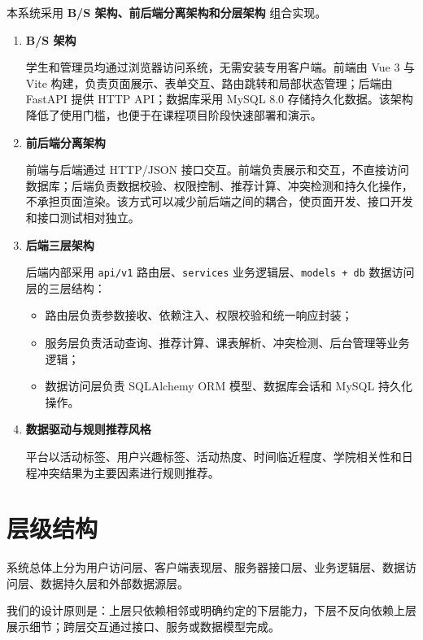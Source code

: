 \documentclass[UTF8,a4paper,12pt,fontset=none]{ctexrep}
\providecommand{\tightlist}{}
\begin{document}
本系统采用 \textbf{B/S 架构、前后端分离架构和分层架构} 组合实现。

\begin{enumerate}
\def\labelenumi{\arabic{enumi}.}
\item
  \textbf{B/S 架构}

  学生和管理员均通过浏览器访问系统，无需安装专用客户端。前端由 Vue 3 与 Vite 构建，负责页面展示、表单交互、路由跳转和局部状态管理；后端由 FastAPI 提供 HTTP API；数据库采用 MySQL 8.0 存储持久化数据。该架构降低了使用门槛，也便于在课程项目阶段快速部署和演示。
\item
  \textbf{前后端分离架构}

  前端与后端通过 HTTP/JSON 接口交互。前端负责展示和交互，不直接访问数据库；后端负责数据校验、权限控制、推荐计算、冲突检测和持久化操作，不承担页面渲染。该方式可以减少前后端之间的耦合，使页面开发、接口开发和接口测试相对独立。
\item
  \textbf{后端三层架构}

  后端内部采用 \texttt{api/v1} 路由层、\texttt{services} 业务逻辑层、\texttt{models\ +\ db} 数据访问层的三层结构：

  \begin{itemize}
  \tightlist
  \item
    路由层负责参数接收、依赖注入、权限校验和统一响应封装；
  \item
    服务层负责活动查询、推荐计算、课表解析、冲突检测、后台管理等业务逻辑；
  \item
    数据访问层负责 SQLAlchemy ORM 模型、数据库会话和 MySQL 持久化操作。
  \end{itemize}
\item
  \textbf{数据驱动与规则推荐风格}

  平台以活动标签、用户兴趣标签、活动热度、时间临近程度、学院相关性和日程冲突结果为主要因素进行规则推荐。
\end{enumerate}

\section{层级结构}\label{ux5c42ux7ea7ux7ed3ux6784}

系统总体上分为用户访问层、客户端表现层、服务器接口层、业务逻辑层、数据访问层、数据持久层和外部数据源层。

我们的设计原则是：上层只依赖相邻或明确约定的下层能力，下层不反向依赖上层展示细节；跨层交互通过接口、服务或数据模型完成。
\end{document}
